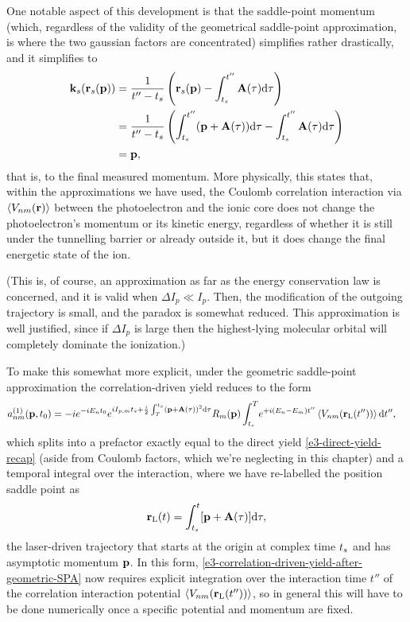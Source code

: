 One notable aspect of this development is that the saddle-point momentum (which, regardless of the validity of the geometrical saddle-point approximation, is where the two gaussian factors are concentrated) simplifies rather drastically, and it simplifies to
\begin{align}
\vb{k}_s(\vb{r}_s(\vb{p})) 
& = 
\frac{1}{t''-{t_s}} \left(  \vb{r}_s(\vb{p})-\int_{{t_s}}^{t''}\vb{A}(\tau)\mathrm{d}\tau \right)
\nonumber \\ & = 
\frac{1}{t''-{t_s}} \left(  \int_{{t_s}}^{t''} (\vb{p}+\vb{A}(\tau))\mathrm{d}\tau - \int_{{t_s}}^{t''}\vb{A}(\tau)\mathrm{d}\tau  \right)
\nonumber \\ & = 
\vb{p}
,
\end{align}
that is, to the final measured momentum. More physically, this states that, within the approximations we have used, the Coulomb correlation interaction via $\left\langle V_{nm}\mathopen{}\left( \vb{r} \right)\mathclose{} \right\rangle$ between the photoelectron and the ionic core does not change the photoelectron's momentum or its kinetic energy, regardless of whether it is still under the tunnelling barrier or already outside it, but it does change the final energetic state of the ion.

(This is, of course, an approximation as far as the energy conservation law is concerned, and it is valid when $\Delta I_p\ll I_p$. Then, the modification of the outgoing trajectory is small, and the paradox is somewhat reduced. This approximation is well justified, since if $\Delta I_p$ is large then the highest-lying molecular orbital will completely dominate the ionization.)

To make this somewhat more explicit, under the geometric saddle-point approximation the correlation-driven yield reduces to the form
\begin{align}
a_{nm}^{(1)}(\vb{p},{t_0})
& =
-i
e^{-iE_n {t_0}}
e^{iI_{p,m} {t_s}+\frac{i}{2} \int_T^{{t_s}}\left(\vb{p}+\vb{A}(\tau)\right)^2\mathrm{d}\tau} 
R_m(\vb{p})
\int_{{t_s}}^T\!
e^{+i(E_n-E_m)t''}
\left\langle V_{nm}\mathopen{}\left( \vb{r}_\mathrm{L}(t'') \right)\mathclose{} \right\rangle
\mathrm{d} t''
,
\label{e3-correlation-driven-yield-after-geometric-SPA}
\end{align}
which splits into a prefactor exactly equal to the direct yield \eqref{e3-direct-yield-recap} (aside from Coulomb factors, which we're neglecting in this chapter) and a temporal integral over the interaction, where we have re-labelled the position saddle point as
\begin{equation}
\vb{r}_\mathrm{L}(t) = \int_{{t_s}}^{t} [\vb{p}+\vb{A}(\tau)]\mathrm{d}\tau,
\label{e3-laser-driven-trajectory}
\end{equation}
the laser-driven trajectory that starts at the origin at complex time ${t_s}$ and has asymptotic momentum $\vb{p}$. In this form, \eqref{e3-correlation-driven-yield-after-geometric-SPA} now requires explicit integration over the interaction time $t''$ of the correlation interaction potential $\left\langle V_{nm}\mathopen{}\left( \vb{r}_\mathrm{L}(t'') \right)\mathclose{} \right\rangle$, so in general this will have to be done numerically once a specific potential and momentum are fixed.






